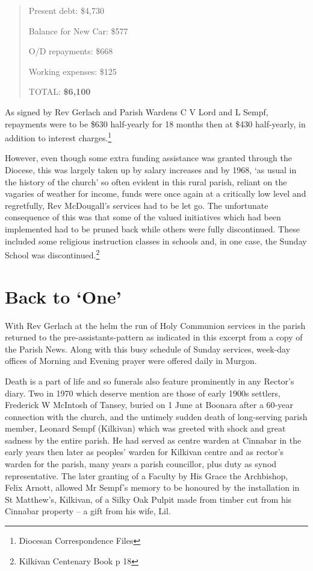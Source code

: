 \begin{quote}
Present debt: \$4,730

Balance for New Car: \$577

O/D repayments: \$668

Working expenses: \$125

TOTAL: \textbf{\$6,100}
\end{quote}

As signed by Rev Gerlach and Parish Wardens C V Lord and L Sempf, repayments were to be \$630 half-yearly for 18 months then at \$430 half-yearly, in addition to interest charges.\footnote{Diocesan Correspondence Files}

However, even though some extra funding assistance was granted through the Diocese, this was largely taken up by salary increases and by 1968, `as usual in the history of the church' so often evident in this rural parish, reliant on the vagaries of weather for income, funds were once again at a critically low level and regretfully, Rev McDougall's services had to be let go. The unfortunate consequence of this was that some of the valued initiatives which had been implemented had to be pruned back while others were fully discontinued. These included some religious instruction classes in schools and, in one case, the Sunday School was discontinued.\footnote{Kilkivan Centenary Book p 18}

\hypertarget{back-to-one}{%
\section{Back to `One'}\label{back-to-one}}

With Rev Gerlach at the helm the run of Holy Communion services in the parish returned to the pre-assistants-pattern as indicated in this excerpt from a copy of the Parish News. Along with this busy schedule of Sunday services, week-day offices of Morning and Evening prayer were offered daily in Murgon.

Death is a part of life and so funerals also feature prominently in any Rector's diary. Two in 1970 which deserve mention are those of early 1900s settlers, Frederick W McIntosh of Tansey, buried on 1 June at Boonara after a 60-year connection with the church, and the untimely sudden death of long-serving parish member, Leonard Sempf (Kilkivan) which was greeted with shock and great sadness by the entire parish. He had served as centre warden at Cinnabar in the early years then later as peoples' warden for Kilkivan centre and as rector's warden for the parish, many years a parish councillor, plus duty as synod representative. The later granting of a Faculty by His Grace the Archbishop, Felix Arnott, allowed Mr Sempf's memory to be honoured by the installation in St Matthew's, Kilkivan, of a Silky Oak Pulpit made from timber cut from his Cinnabar property -- a gift from his wife, Lil.

